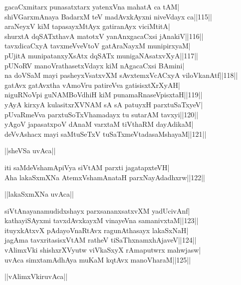 \documentclass{article}
\begin{document}
gacaCxmitarx punasatxtarx yatenxVna mahatA ca tAM|\\
shiVGarxmAnaya BadarxM teV madAvxkAyxni niveVdayx ca||115||\\
araNeyxV kiM tapasayxMtAyx gatiranAyx viciMtitA|\\
shurxtA dqSATxthavA matotxV yanAnxgacaCxsi jAnakiV||116||\\
tavxdicaCxyA tavxmeVveVtoV gatAraNayxM munipirxyaM|\\
pUjitA munipatanxyXsAtx dqSATx munigaNAsatxvXyA||117||\\
pUNoRV manoVrathasetxVdayx kiM nAgacaCxsi BAmini|\\
na doVSaM mayi pasheyxVsatxvXM sAvxtemxVcACxyA viloVkanAtf||118||\\
gatAvx gatAvxtha vAmoVru patireVva gatisisxtXrXyAH|\\
niguRNoVpi guNAMBoVdhiH kiM punamaRnaseVpisxtaH||119||\\
yAyA kirxyA kulasitxrXVNAM sA sA patuyxH parxtuSaTxyeV|\\
pUvaRmeVva parxtuSoTxVhamadayx tu sutarAM tavxyi||120||\\
yAgoV japasatxpoV dAnaM varxtaM tiVthaRM dayAdikaM|\\
deVvAshacx mayi saMtuSeTxV tuSaTxmeVtadasaMshayaM||121||\\

\begin{center}
||sheVSa uvAca||
\end{center}

iti saMdeVshamApiVya siVtAM parxti jagatapxteVH|\\
Aha lakaSxmXNa AtemxVshamAnataH parxNayAdadhxrw||122||\\

\begin{center}
||lakaSxmXNa uvAca||
\end{center}

siVtAnayanamudidxshayx parxsananxsatxvXM yadUcivAnf|\\
kathayiSAyxmi tavxdAvxkayxM vinayeVna samanivxtaM||123||\\
ituyxkAtxvX pAdayoVnaRtAvx ragunAthasayx lakaSxNaH|\\
jagAma tavxritasisxVtAM ratheV tiSaThxnamxhAjaveV||124||\\
vAlimxVki shishxrXVyutw viVkaSxyX rAmaputwrx mahwjasw|\\
uvAca simxtamAdhAya muKaM kqtAvx manoVharaM||125||\\

\begin{center}
||vAlimxVkiruvAca||
\end{center}
\end{document}
